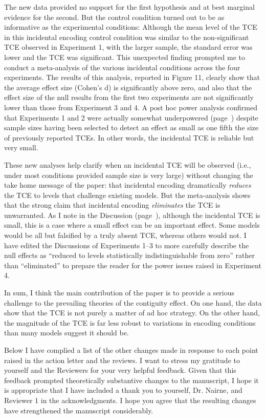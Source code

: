 \documentclass[12pt]{article}
\begin{document}
The new data provided no support for the first hypothesis and at best marginal evidence for the second. But the control condition turned out to be as informative as the experimental conditions: Although the mean level of the TCE in this incidental encoding control condition was similar to the non-significant TCE observed in Experiment 1, with the larger sample, the standard error was lower and the TCE was significant. This unexpected finding prompted me to conduct a meta-analysis of the various incidental conditions across the four experiments. The results of this analysis, reported in Figure 11, clearly show that the average effect size (Cohen's d) is significantly above zero, and also that the effect size of the null results from the first two experiments are not significantly lower than those from Experiment 3 and 4. A post hoc power analysis confirmed that Experiments 1 and 2 were actually somewhat underpowered (page~\pageref{power}) despite sample sizes having been selected to detect an effect as small as one fifth the size of previously reported TCEs. In other words, the incidental TCE is reliable but very small.

These new analyses help clarify when an incidental TCE will be observed (i.e., under most conditions provided sample size is very large) without changing the take home message of the paper: that incidental encoding dramatically \emph{reduces} the TCE to levels that challenge existing models. But the meta-analysis shows that the strong claim that incidental encoding \emph{eliminates} the TCE is unwarranted. As I note in the Discussion (page~\pageref{zerovsnear}), although the incidental TCE is small, this is a case where a small effect can be an important effect. Some models would be all but falsified by a truly absent TCE, whereas others would not. I have edited the Discussions of Experiments 1--3 to more carefully describe the null effects as ``reduced to levels statistically indistinguishable from zero'' rather than ``eliminated'' to prepare the reader for the power issues raised in Experiment 4.

In sum, I think the main contribution of the paper is to provide a serious challenge to the prevailing theories of the contiguity effect. On one hand, the data show that the TCE is not purely a matter of ad hoc strategy. On the other hand, the magnitude of the TCE is far less robust to variations in encoding conditions than many models suggest it should be. 

Below I have complied a list of the other changes made in response to each point raised in the action letter and the reviews. I want to stress my gratitude to yourself and the Reviewers for your very helpful feedback. Given that this feedback prompted theoretically substantive changes to the manuscript, I hope it is appropriate that I have included a thank you to yourself, Dr. Nairne, and Reviewer 1 in the acknowledgments. I hope you agree that the resulting changes have strengthened the manuscript considerably.
\end{document}
